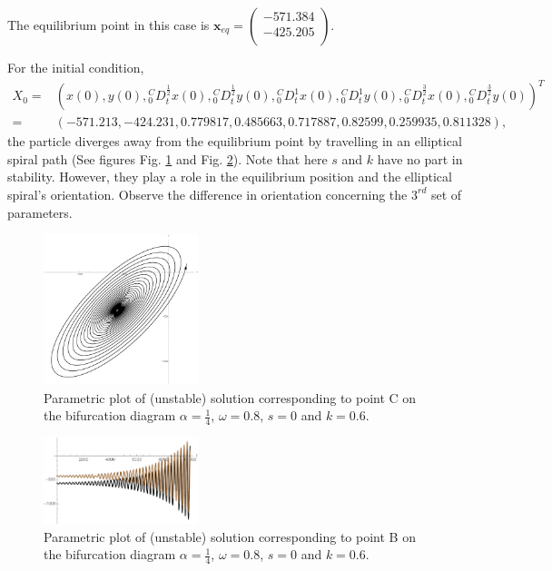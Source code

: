 \documentclass[pdflatex,sn-mathphys]{sn-jnl}%
\theoremstyle{thmstyleone}%
\theoremstyle{thmstyletwo}%
\theoremstyle{thmstylethree}%
\begin{document}
The equilibrium point in this case is
$\mathbf{x}_{eq}=
\left(
\begin{array}{c}
 -571.384 \\
-425.205 \\
\end{array}
\right)$.

For the initial condition, \begin{align*}
X_{0}=&
\left(
x(0) ,
y(0) ,
{ }_{0}^{C}D_{t}^{\frac{1}{2}}x(0) ,
{ }_{0}^{C}D_{t}^{\frac{1}{2}}y(0) ,
{ }_{0}^{C}D_{t}^{1} x(0) ,
{ }_{0}^{C}D_{t}^{1}y(0) ,
{ }_{0}^{C}D_{t}^{\frac{3}{2}}x(0) ,
{ }_{0}^{C}D_{t}^{\frac{3}{2}}y(0)
\right)^T \\ =& \left(
 -571.213,
 -424.231,
 0.779817,
 0.485663,
 0.717887,
 0.82599,
 0.259935,
 0.811328 
\right),
\end{align*}
the particle diverges away from the equilibrium point by travelling in an elliptical spiral path (See figures Fig. \ref{fig:Unstable parametric s,k corresponding to point B on bifurcation diagram} and Fig. \ref{fig:Unstale s,k. corresponding to point B on bifurcation diagram}). Note that here $s$ and $k$ have no part in stability. However, they play a role in the equilibrium position and the elliptical spiral's orientation. Observe the difference in orientation concerning the $3^{rd}$ set of parameters. 
\begin{figure}[h]%
\centering
\includegraphics[width=0.4\textwidth]{Fig3right(unstable)Parametric}
    \caption{Parametric plot of (unstable) solution corresponding to point C on the bifurcation diagram  $\alpha = \frac{1}{4}$, $\omega = 0.8$, $s=0$ and $ k=0.6$.}
    \label{fig:Unstable parametric s,k corresponding to point B on bifurcation diagram}
\end{figure}
\begin{figure}[h]%
\centering
      \includegraphics[width=0.4\textwidth]{Fig3right(unstable)plot}
    \caption{Parametric plot of (unstable) solution corresponding to point B on the bifurcation diagram  $\alpha = \frac{1}{4}$, $\omega = 0.8$, $s=0$ and $k=0.6$.}
    \label{fig:Unstale s,k. corresponding to point B on bifurcation diagram}
\end{figure}
\end{document}
